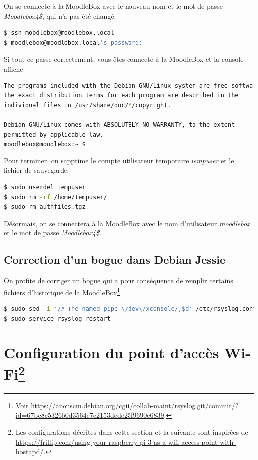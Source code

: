 \documentclass[11pt]{article}
\begin{document}
On se connecte à la MoodleBox avec le nouveau nom et le mot de passe \emph{Moodlebox4\$}, qui n'a pas été changé.

\begin{lstlisting}[language=bash]
$ ssh moodlebox@moodlebox.local
$ moodlebox@moodlebox.local's password:
\end{lstlisting}

\begin{verification}
Si tout ce passe correctement, vous êtes connecté à la MoodleBox et la console affiche
\begin{lstlisting}[language=bash]
The programs included with the Debian GNU/Linux system are free software;
the exact distribution terms for each program are described in the
individual files in /usr/share/doc/*/copyright.

Debian GNU/Linux comes with ABSOLUTELY NO WARRANTY, to the extent
permitted by applicable law.
moodlebox@moodlebox:~ $
\end{lstlisting}
\end{verification}

Pour terminer, on supprime le compte utilisateur temporaire \emph{tempuser} et le fichier de sauvegarde:
\begin{lstlisting}[language=bash]
$ sudo userdel tempuser
$ sudo rm -rf /home/tempuser/
$ sudo rm authfiles.tgz
\end{lstlisting}

Désormais, on se connectera à la MoodleBox avec le nom d'utilisateur \emph{moodlebox} et le mot de passe \emph{Moodlebox4\$}.

\subsection{Correction d'un bogue dans Debian Jessie}

On profite de corriger un bogue qui a pour conséquence de remplir certains fichiers d'historique de la MoodleBox\footnote{Voir \url{https://anonscm.debian.org/cgit/collab-maint/rsyslog.git/commit/?id=67bc8e5326b0d3564c7e2153dede25f9690e6839}.}.

\begin{lstlisting}[language=bash]
$ sudo sed -i '/# The named pipe \/dev\/xconsole/,$d' /etc/rsyslog.conf
$ sudo service rsyslog restart
\end{lstlisting}

\section[Configuration du point d'accès Wi-Fi]{Configuration du point d'accès Wi-Fi\footnote{Les configurations décrites dans cette section et la suivante sont inspirées de \url{https://frillip.com/using-your-raspberry-pi-3-as-a-wifi-access-point-with-hostapd/}.}}
\end{document}
